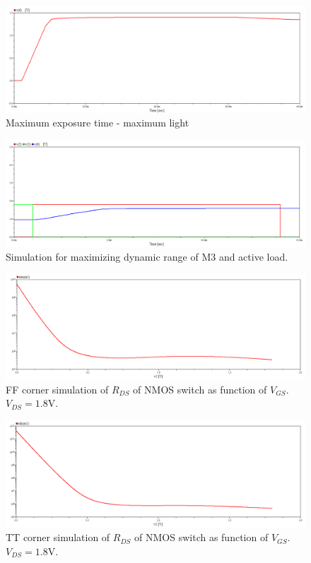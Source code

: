 \begin{figure}[H]
    \centering
    \includegraphics[width=\textwidth]{graphs/maxExp_maxLight.png}
    \caption{Maximum exposure time - maximum light}
    \label{fig:max-max}
\end{figure}

\begin{figure}[H]
    \centering
    \includegraphics[width=\textwidth]{graphs/m3AndActiveLoadSim.png}
    \caption{Simulation for maximizing dynamic range of M3 and active load.}
    \label{fig:m3AndActiveLoadSim}
\end{figure}

\begin{figure}[H]
    \centering
    \includegraphics[width=\textwidth]{graphs/corner_ff_simulation.png}
    \caption{FF corner simulation of $R_{DS}$ of NMOS switch as function of $V_{GS}$. $V_{DS} = 1.8\mathrm{V}$.}
    \label{fig:ff}
\end{figure}

\begin{figure}[H]
    \centering
    \includegraphics[width=\textwidth]{graphs/corner_tt_simulation.png}
    \caption{TT corner simulation of $R_{DS}$ of NMOS switch as function of $V_{GS}$. $V_{DS} = 1.8\mathrm{V}$.}
    \label{fig:tt}
\end{figure}

